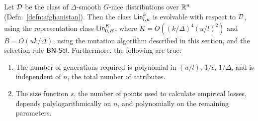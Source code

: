 \begin{theorem} Let ${\mathcal D}$ be the class of $\Delta$-smooth $G$-nice
distributions over $\mathbb{R}^n$ (Defn.~\ref{defn:afghanistan}). Then the
class $\mathsf{Lin}^k_{l, u}$ is evolvable with respect to ${\mathcal D}$, using the
representation class $\mathsf{Lin}^K_{0, B}$, where $K = O((k/\Delta)^4 (u/l)^2)$ and $B
= O(uk/\Delta)$, using the mutation algorithm described in this section, and the
selection rule $\mathsf{BN\mbox{-}Sel}$.  Furthermore, the following are true:
\begin{enumerate}
%
\item The number of generations required is polynomial in $(u/l)$, $1/\epsilon$,
$1/\Delta$, and is independent of $n$, the total number of attributes. 
%
\item The size function $s$, the number of points used to calculate empirical
losses, depends polylogarithmically on $n$, and
polynomially on the remaining parameters. 
%
\end{enumerate}
\label{thm:sparse_linear} \end{theorem}
